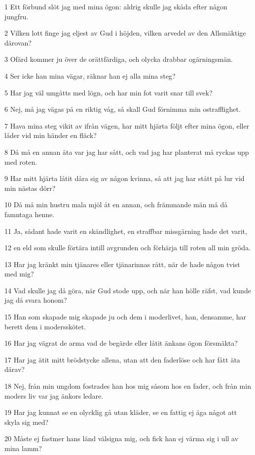 \par 1 Ett förbund slöt jag med mina ögon: aldrig skulle jag skåda efter någon jungfru.
\par 2 Vilken lott finge jag eljest av Gud i höjden, vilken arvedel av den Allsmäktige därovan?
\par 3 Ofärd kommer ju över de orättfärdiga, och olycka drabbar ogärningsmän.
\par 4 Ser icke han mina vägar, räknar han ej alla mina steg?
\par 5 Har jag väl umgåtts med lögn, och har min fot varit snar till svek?
\par 6 Nej, må jag vägas på en riktig våg, så skall Gud förnimma min ostrafflighet.
\par 7 Hava mina steg vikit av ifrån vägen, har mitt hjärta följt efter mina ögon, eller låder vid min händer en fläck?
\par 8 Då må en annan äta var jag har sått, och vad jag har planterat må ryckas upp med roten.
\par 9 Har mitt hjärta låtit dåra sig av någon kvinna, så att jag har stått på lur vid min nästas dörr?
\par 10 Då må min hustru mala mjöl åt en annan, och främmande män må då famntaga henne.
\par 11 Ja, sådant hade varit en skändlighet, en straffbar missgärning hade det varit,
\par 12 en eld som skulle förtära intill avgrunden och förhärja till roten all min gröda.
\par 13 Har jag kränkt min tjänares eller tjänarinnas rätt, när de hade någon tvist med mig?
\par 14 Vad skulle jag då göra, när Gud stode upp, och när han hölle räfst, vad kunde jag då svara honom?
\par 15 Han som skapade mig skapade ju och dem i moderlivet, han, densamme, har berett dem i modersskötet.
\par 16 Har jag vägrat de arma vad de begärde eller låtit änkans ögon försmäkta?
\par 17 Har jag ätit mitt brödstycke allena, utan att den faderlöse och har fått äta därav?
\par 18 Nej, från min ungdom fostrades han hos mig såsom hos en fader, och från min moders liv var jag änkors ledare.
\par 19 Har jag kunnat se en olycklig gå utan kläder, se en fattig ej äga något att skyla sig med?
\par 20 Måste ej fastmer hans länd välsigna mig, och fick han ej värma sig i ull av mina lamm?
